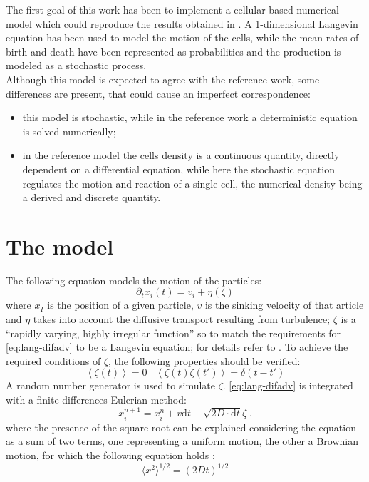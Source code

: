 \label{sec:peculiar_1D}
The first goal of this work has been to implement a cellular-based numerical model which could reproduce the results obtained in \autocite{Huisman2002HowPersist}. A 1-dimensional Langevin equation has been used to model the motion of the cells, while the mean rates of birth and death have been represented as probabilities and the production is modeled as a stochastic process. \\
Although this model is expected to agree with the reference work, some differences are present, that could cause an imperfect correspondence:
\begin{itemize}
\item this model is stochastic, while in the reference work a deterministic equation is solved numerically;
\item in the reference model the cells density is a continuous quantity, directly dependent on a differential equation, while here the stochastic equation regulates the motion and reaction of a single cell, the numerical density being a derived and discrete quantity.
\end{itemize}

\section{The model}
The following equation models the motion of the particles:
\begin{equation} \label{eq:lang-difadv}
  \partial_t x_i(t) = v_i + \eta(\zeta)
\end{equation}
where $x_I$ is the position of a given particle, $v$ is the sinking velocity of that article and $\eta$ takes into account the diffusive transport resulting from turbulence;
$\zeta$ is a ``rapidly varying, highly irregular function'' so to match the requirements for \autoref{eq:lang-difadv} to be a Langevin equation; for details refer to \autocite[chapter 4.1]{gard-hand}.
To achieve the required conditions of $\zeta$, the following properties should be verified:
\[ \left<\zeta(t)\right> = 0 \;\;\; \left<\zeta(t)\zeta(t')\right>=\delta(t-t') \]
A random number generator is used to simulate $\zeta$.%
\autoref{eq:lang-difadv} is integrated with a finite-differences Eulerian method:
\begin{equation} \label{eq:eul-difadv}
  x_i^{n+1} = x_i^n + v\mathrm{d}t + \sqrt{2D\cdot\mathrm{d}t}\zeta \;.
\end{equation}
where the presence of the square root can be explained considering the equation as a sum of two terms, one representing a uniform motion, the other a Brownian motion, for which the following equation holds \autocite[chapter 1]{berg1993random}:
\[ \langle x^2 \rangle ^{1/2} = (2Dt)^{1/2} \]

